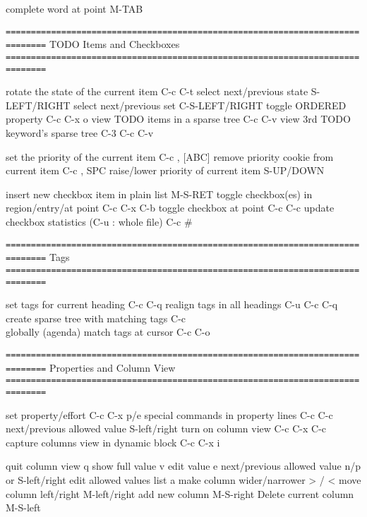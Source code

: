 \documentclass[10pt,a4paper]{article}
\begin{document}
complete word at point                            M-TAB




\texttt{==============================================================================}
TODO Items and Checkboxes
\texttt{==============================================================================}

rotate the state of the current item              C-c C-t
select next/previous state                        S-LEFT/RIGHT
select next/previous set                          C-S-LEFT/RIGHT
toggle ORDERED property                           C-c C-x o
view TODO items in a sparse tree                  C-c C-v
view 3rd TODO keyword's sparse tree               C-3 C-c C-v

set the priority of the current item              C-c , [ABC]
remove priority cookie from current item          C-c , SPC
raise/lower priority of current item              S-UP/DOWN\notetwo

insert new checkbox item in plain list            M-S-RET
toggle checkbox(es) in region/entry/at point      C-c C-x C-b
toggle checkbox at point                          C-c C-c
update checkbox statistics (C-u : whole file)     C-c \#

\texttt{==============================================================================}
Tags
\texttt{==============================================================================}

set tags for current heading                      C-c C-q
realign tags in all headings                      C-u C-c C-q
create sparse tree with matching tags             C-c \\
globally (agenda) match tags at cursor            C-c C-o

\texttt{==============================================================================}
Properties and Column View
\texttt{==============================================================================}

set property/effort                               C-c C-x p/e
special commands in property lines                C-c C-c
next/previous allowed value                       S-left/right
turn on column view                               C-c C-x C-c
capture columns view in dynamic block             C-c C-x i

quit column view                                  q
show full value                                   v
edit value                                        e
next/previous allowed value                       n/p or S-left/right
edit allowed values list                          a
make column wider/narrower                        > / <
move column left/right                            M-left/right
add new column                                    M-S-right
Delete current column                             M-S-left
\end{document}
